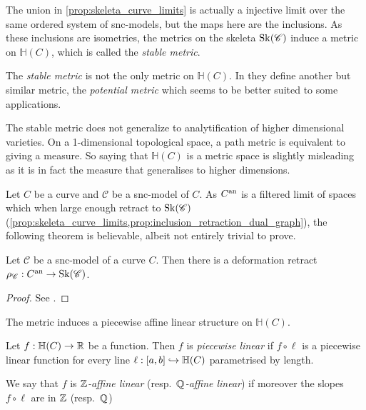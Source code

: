 The union in \cref{prop:skeleta_curve_limits} is actually a injective limit over the same ordered system of snc-models, but the maps here are the inclusions. 
As these inclusions are isometries, the metrics on the skeleta $\operatorname{Sk}(\mathscr C)$ induce a metric on $\mathbb{H}(C)$, which is called the \emph{stable metric}. 

\begin{remark}
	The \emph{stable metric} is not the only metric on $\mathbb{H}(C)$. 
	In \cite{bakerWeightFunctionsBerkovich2016} they define another but similar metric, the \emph{potential metric} which seems to be better suited to some applications. 
\end{remark}

\begin{remark}
	The stable metric does not generalize to analytification of higher dimensional varieties. 
	On a 1-dimensional topological space, a path metric is equivalent to giving a measure. 
	So saying that $\mathbb{H}(C)$ is a metric space is slightly misleading as it is in fact the measure that generalises to higher dimensions. 
\end{remark}

Let $C$ be a curve and $\mathscr C$ be a snc-model of $C$. 
As $C{}^{\text{an}}$ is a filtered limit of spaces which when large enough retract to $\operatorname{Sk}(\mathscr C)$ (\cref{prop:skeleta_curve_limits,prop:inclusion_retraction_dual_graph}), the following theorem is believable, albeit not entirely trivial to prove. 
\begin{proposition}\label{prop:retract_analytification_skeleton}
	Let $\mathscr C$ be a snc-model of a curve $C$. 
	Then there is a deformation retract $\rho_{\mathscr C}: C{}^{\text{an}} \to \operatorname{Sk}(\mathscr C)$. 
\end{proposition}
\begin{proof}
	See \cite[§2.2.2]{bakerWeightFunctionsBerkovich2016}.
\end{proof}

The metric induces a piecewise affine linear structure on $\mathbb{H}(C)$. 
\begin{definition}
	Let $f: \mathbb{H}(C) \to \mathbb{R}$ be a function. 
	Then $f$ is \emph{piecewise linear} if $f \circ \ell$  is a piecewise linear function for every line $\ell: [a, b] \hookrightarrow \mathbb{H}(C)$ parametrised by length. 

	We say that $f$ is \emph{$\mathbb{Z}$-affine linear} (resp.\ \emph{$\mathbb{Q}$-affine linear}) if moreover the slopes $f \circ \ell$ are in $\mathbb{Z} $ (resp.\ $\mathbb{Q}$)
\end{definition}



